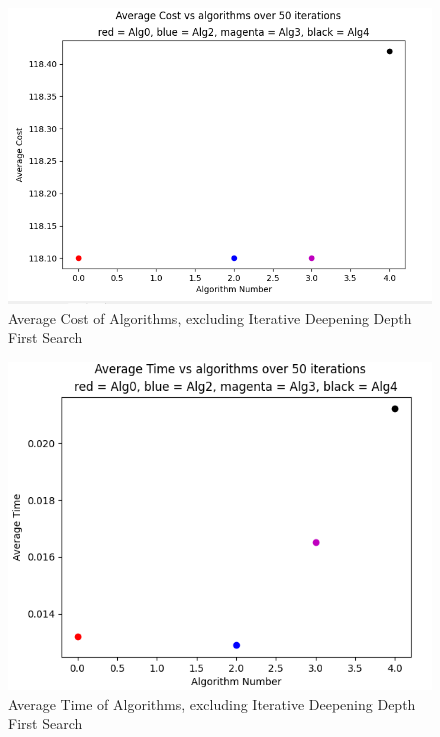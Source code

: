 \documentclass[a4paper]{article}
\begin{document}
\newpage
\begin{figure}[ht]
    \centering
    \includegraphics[width=\textwidth]{avgcost.png}
    \caption{Average Cost of Algorithms, excluding Iterative Deepening Depth First Search}
    \label{fig:avgcost}
\end{figure}
\newpage
\begin{figure}[ht]
    \centering
    \includegraphics[width=\textwidth]{avgtime.png}
    \caption{Average Time of Algorithms, excluding Iterative Deepening Depth First Search}
    \label{fig:avgtime}
\end{figure}
\end{document}
